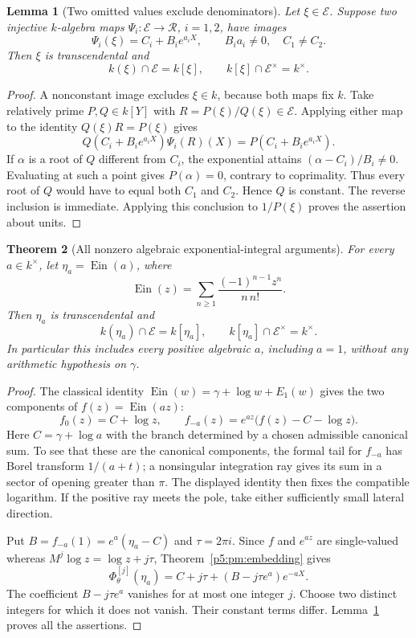 \documentclass[11pt,a4paper]{article}
\newtheorem{theorem}{Theorem}[section]
\newtheorem{lemma}[theorem]{Lemma}
\theoremstyle{definition}
\theoremstyle{remark}
\numberwithin{equation}{section}
\begin{document}
\begin{lemma}[Two omitted values exclude denominators]
\label{p5:pm:two-centers}
Let $\xi\in\mathcal E$.  Suppose two injective $k$-algebra maps
$\Psi_i:\mathcal E\to\mathcal R$, $i=1,2$, have images
\[
 \Psi_i(\xi)=C_i+B_i e^{a_iX},\qquad
 B_i a_i\ne0,\quad C_1\ne C_2.
\]
Then $\xi$ is transcendental and
\[
 k(\xi)\cap\mathcal E=k[\xi],
 \qquad k[\xi]\cap\mathcal E^\times=k^\times.
\]
\end{lemma}
\begin{proof}
A nonconstant image excludes $\xi\in k$, because both maps fix $k$.
Take relatively prime $P,Q\in k[Y]$ with
$R=P(\xi)/Q(\xi)\in\mathcal E$.  Applying either map to the
identity $Q(\xi)R=P(\xi)$ gives
\[
 Q(C_i+B_i e^{a_iX})\Psi_i(R)(X)
       =P(C_i+B_i e^{a_iX}).
\]
If $\alpha$ is a root of $Q$ different from $C_i$, the exponential
attains $(\alpha-C_i)/B_i\ne0$.  Evaluating at such a point gives
$P(\alpha)=0$, contrary to coprimality.  Thus every root of $Q$
would have to equal both $C_1$ and $C_2$.  Hence $Q$ is constant.
The reverse inclusion is immediate.  Applying this conclusion to
$1/P(\xi)$ proves the assertion about units.
\end{proof}

\begin{theorem}[All nonzero algebraic exponential-integral arguments]
\label{p5:pm:ein}
For every $a\in k^\times$, let $\eta_a=\operatorname{Ein}(a)$, where
\[
 \operatorname{Ein}(z)=\sum_{n\ge1}\frac{(-1)^{n-1}z^n}{n\,n!}.
\]
Then $\eta_a$ is transcendental and
\begin{equation}\label{p5:pm:ein-intersection}
 k(\eta_a)\cap\mathcal E=k[\eta_a],
 \qquad k[\eta_a]\cap\mathcal E^\times=k^\times.
\end{equation}
In particular this includes every positive algebraic $a$, including
$a=1$, without any arithmetic hypothesis on $\gamma$.
\end{theorem}
\begin{proof}
The classical identity
$\operatorname{Ein}(w)=\gamma+\log w+E_1(w)$
\cite[\S6.2]{p5:DLMF} gives the two components of
$f(z)=\operatorname{Ein}(az)$:
\[
 f_0(z)=C+\log z,\qquad
 f_{-a}(z)=e^{az}\bigl(f(z)-C-\log z\bigr).
\]
Here $C=\gamma+\log a$ with the branch determined by a chosen
admissible canonical sum.  To see that these are the canonical
components, the formal tail for $f_{-a}$ has Borel transform
$1/(a+t)$; a nonsingular integration ray gives its sum in a sector
of opening greater than $\pi$.  The displayed identity then fixes
the compatible logarithm.  If the positive ray meets the pole,
take either sufficiently small lateral direction.

Put $B=f_{-a}(1)=e^a(\eta_a-C)$ and $\tau=2\pi i$.
Since $f$ and $e^{az}$ are single-valued whereas
$M^j\log z=\log z+j\tau$, Theorem~\ref{p5:pm:embedding} gives
\begin{equation}\label{p5:pm:ein-windings}
 \Phi_\theta^{[j]}(\eta_a)
   =C+j\tau+(B-j\tau e^a)e^{-aX}.
\end{equation}
The coefficient $B-j\tau e^a$ vanishes for at most one integer
$j$.  Choose two distinct integers for which it does not vanish.
Their constant terms differ.  Lemma~\ref{p5:pm:two-centers} proves
all the assertions.
\end{proof}
\end{document}
